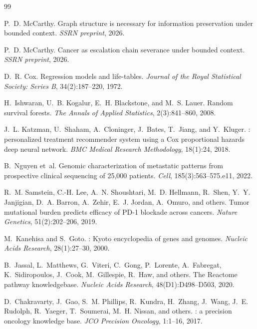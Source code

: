 \documentclass[11pt]{article}
\begin{document}

\begin{thebibliography}{99}

P.~D. McCarthy.
\newblock Graph structure is necessary for information preservation under
  bounded context.
\newblock \emph{SSRN preprint}, 2026.

P.~D. McCarthy.
\newblock Cancer as escalation chain severance under bounded context.
\newblock \emph{SSRN preprint}, 2026.

D.~R. Cox.
\newblock Regression models and life-tables.
\newblock \emph{Journal of the Royal Statistical Society: Series B},
  34(2):187--220, 1972.

H.~Ishwaran, U.~B. Kogalur, E.~H. Blackstone, and M.~S. Lauer.
\newblock Random survival forests.
\newblock \emph{The Annals of Applied Statistics}, 2(3):841--860, 2008.

J.~L. Katzman, U.~Shaham, A.~Cloninger, J.~Bates, T.~Jiang, and Y.~Kluger.
: personalized treatment recommender system using a {Cox}
  proportional hazards deep neural network.
\newblock \emph{BMC Medical Research Methodology}, 18(1):24, 2018.

B.~Nguyen et~al.
\newblock Genomic characterization of metastatic patterns from prospective
  clinical sequencing of 25,000 patients.
\newblock \emph{Cell}, 185(3):563--575.e11, 2022.

R.~M. Samstein, C.-H. Lee, A.~N. Shoushtari, M.~D. Hellmann, R.~Shen,
  Y.~Y. Janjigian, D.~A. Barron, A.~Zehir, E.~J. Jordan, A.~Omuro, and
  others.
\newblock Tumor mutational burden predicts efficacy of {PD-1} blockade across
  cancers.
\newblock \emph{Nature Genetics}, 51(2):202--206, 2019.

M.~Kanehisa and S.~Goto.
: {K}yoto encyclopedia of genes and genomes.
\newblock \emph{Nucleic Acids Research}, 28(1):27--30, 2000.

B.~Jassal, L.~Matthews, G.~Viteri, C.~Gong, P.~Lorente, A.~Fabregat,
  K.~Sidiropoulos, J.~Cook, M.~Gillespie, R.~Haw, and others.
\newblock The {R}eactome pathway knowledgebase.
\newblock \emph{Nucleic Acids Research}, 48(D1):D498--D503, 2020.

D.~Chakravarty, J.~Gao, S.~M. Phillips, R.~Kundra, H.~Zhang, J.~Wang,
  J.~E. Rudolph, R.~Yaeger, T.~Soumerai, M.~H. Nissan, and others.
: a precision oncology knowledge base.
\newblock \emph{JCO Precision Oncology}, 1:1--16, 2017.

\end{thebibliography}
\end{document}
